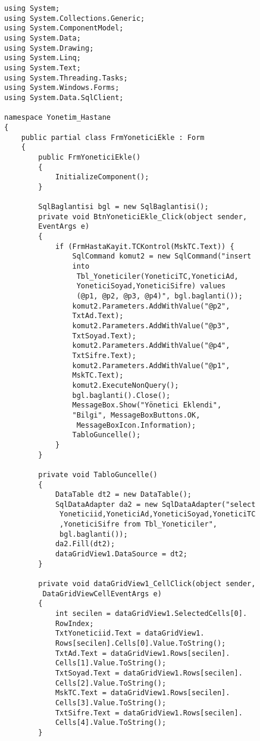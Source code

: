 \begin{lstlisting}
using System;
using System.Collections.Generic;
using System.ComponentModel;
using System.Data;
using System.Drawing;
using System.Linq;
using System.Text;
using System.Threading.Tasks;
using System.Windows.Forms;
using System.Data.SqlClient;

namespace Yonetim_Hastane
{
    public partial class FrmYoneticiEkle : Form
    {
        public FrmYoneticiEkle()
        {
            InitializeComponent();
        }

        SqlBaglantisi bgl = new SqlBaglantisi();
        private void BtnYoneticiEkle_Click(object sender, 
        EventArgs e)
        {
            if (FrmHastaKayit.TCKontrol(MskTC.Text)) {
                SqlCommand komut2 = new SqlCommand("insert 
                into
                 Tbl_Yoneticiler(YoneticiTC,YoneticiAd,
                 YoneticiSoyad,YoneticiSifre) values 
                 (@p1, @p2, @p3, @p4)", bgl.baglanti());
                komut2.Parameters.AddWithValue("@p2", 
                TxtAd.Text);
                komut2.Parameters.AddWithValue("@p3", 
                TxtSoyad.Text);
                komut2.Parameters.AddWithValue("@p4", 
                TxtSifre.Text);
                komut2.Parameters.AddWithValue("@p1", 
                MskTC.Text);
                komut2.ExecuteNonQuery();
                bgl.baglanti().Close();
                MessageBox.Show("Yönetici Eklendi", 
                "Bilgi", MessageBoxButtons.OK,
                 MessageBoxIcon.Information);
                TabloGuncelle();
            }
        }

        private void TabloGuncelle()
        {
            DataTable dt2 = new DataTable();
            SqlDataAdapter da2 = new SqlDataAdapter("select
             Yoneticiid,YoneticiAd,YoneticiSoyad,YoneticiTC
             ,YoneticiSifre from Tbl_Yoneticiler", 
             bgl.baglanti());
            da2.Fill(dt2);
            dataGridView1.DataSource = dt2;
        }

        private void dataGridView1_CellClick(object sender,
         DataGridViewCellEventArgs e)
        {
            int secilen = dataGridView1.SelectedCells[0].
            RowIndex;
            TxtYoneticiid.Text = dataGridView1.
            Rows[secilen].Cells[0].Value.ToString();
            TxtAd.Text = dataGridView1.Rows[secilen].
            Cells[1].Value.ToString();
            TxtSoyad.Text = dataGridView1.Rows[secilen].
            Cells[2].Value.ToString();
            MskTC.Text = dataGridView1.Rows[secilen].
            Cells[3].Value.ToString();
            TxtSifre.Text = dataGridView1.Rows[secilen].
            Cells[4].Value.ToString();
        }


\end{lstlisting}
